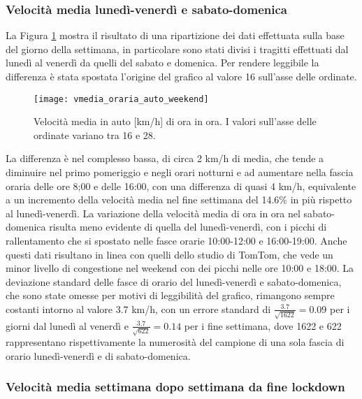 \subsubsection{Velocità media lunedì-venerdì e sabato-domenica}

La Figura \ref{image:4} mostra il risultato di una ripartizione dei dati effettuata sulla base del giorno della settimana, in particolare sono stati divisi i tragitti effettuati dal lunedì al venerdì da quelli del sabato e domenica. Per rendere leggibile la differenza è stata spostata l'origine del grafico al valore 16 sull'asse delle ordinate. 

\begin{figure}[H]
	\centering
	\texttt{[image: vmedia\_oraria\_auto\_weekend]}
	\caption{Velocità media in auto [km/h] di ora in ora. I valori sull'asse delle ordinate variano tra 16 e 28.}
	\label{image:4}
\end{figure}

La differenza è nel complesso bassa, di circa 2 km/h di media, che tende a diminuire nel primo pomeriggio e negli orari notturni e ad aumentare nella fascia oraria delle ore 8;00 e delle 16:00, con una differenza di quasi 4 km/h, equivalente a un incremento della velocità media nel fine settimana del 14.6\% in più rispetto al lunedì-venerdì. La variazione della velocità media di ora in ora nel sabato-domenica risulta meno evidente di quella del lunedì-venerdì, con i picchi di rallentamento che si spostato nelle fasce orarie 10:00-12:00 e 16:00-19:00. Anche questi dati risultano in linea con quelli dello studio di TomTom, che vede un minor livello di congestione nel weekend con dei picchi nelle ore 10:00 e 18:00. La deviazione standard delle fasce di orario del lunedì-venerdì e sabato-domenica, che sono state omesse per motivi di leggibilità del grafico, rimangono sempre costanti intorno al valore 3.7 km/h, con un errore standard di $\frac{3.7}{\sqrt{1622}} = 0.09$ per i giorni dal lunedì al venerdì e $\frac{3.7}{\sqrt{622}} = 0.14$ per i fine settimana, dove 1622 e 622 rappresentano rispettivamente la numerosità del campione di una sola fascia di orario lunedì-venerdì e di sabato-domenica.

\subsubsection{Velocità media settimana dopo settimana da fine lockdown}

